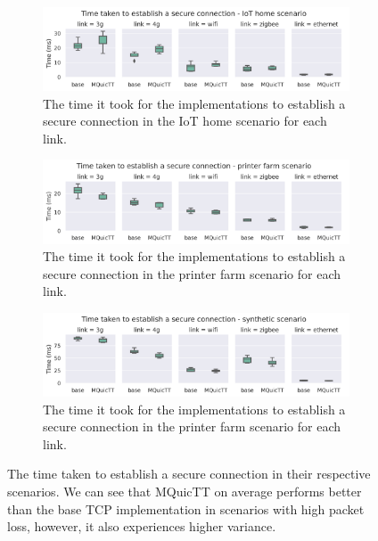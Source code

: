 \begin{figure}
    \begin{center}
        \begin{subfigure}[b]{1\textwidth}
            \includegraphics[width=1\linewidth]{images/analysis_connection_time_home.png}
            \caption{The time it took for the implementations to establish a secure connection in the IoT home scenario for each link.}
            \label{fig:connect_time_home}
        \end{subfigure}
        \vspace{1.5em}

        \begin{subfigure}[b]{1\textwidth}
            \includegraphics[width=1\linewidth]{images/analysis_connection_time_farm.png}
            \caption{The time it took for the implementations to establish a secure connection in the printer farm scenario for each link.}
            \label{fig:connect_time_farm}
        \end{subfigure}
        \vspace{1.5em}

        \begin{subfigure}[b]{1\textwidth}
            \includegraphics[width=1\linewidth]{images/analysis_connection_time_synth.png}
            \caption{The time it took for the implementations to establish a secure connection in the printer farm scenario for each link.}
            \label{fig:connect_time_synth}
        \end{subfigure}

        \caption{The time taken to establish a secure connection in their respective scenarios.
            We can see that MQuicTT on average performs better than the base TCP implementation in scenarios with high packet loss, however, it also experiences higher variance.}
        \label{fig:connection_time}
    \end{center}
\end{figure}

